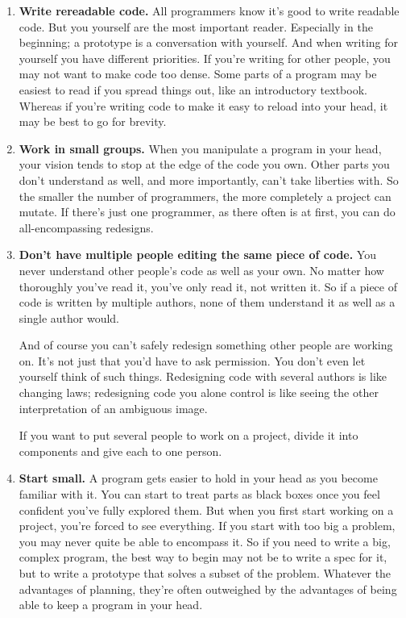 \begin{enumerate}
\item  \textbf{Write rereadable code.}  All programmers know it's good to write
   readable code.  But you yourself are the most important reader.
   Especially in the beginning; a prototype is a conversation with
   yourself.  And when writing for yourself you have different
   priorities.  If you're writing for other people, you may not
   want to make code too dense.  Some parts of a program may be
   easiest to read if you spread things out, like an introductory 
   textbook.  Whereas if you're writing code to make it easy to reload 
   into your head, it may be best to go for brevity.


\item  \textbf{Work in small groups.}  When you manipulate a program in your
   head, your vision tends to stop at the edge of the code you own.
   Other parts you don't understand as well, and more importantly,
   can't take liberties with.  So the smaller the number of
   programmers, the more completely a project can mutate.  If there's
   just one programmer, as there often is at first, you can do
   all-encompassing redesigns.


\item  \textbf{Don't have multiple people editing the same piece of code.}  You
   never understand other people's code as well as your own.  No
   matter how thoroughly you've read it, you've only read it, not
   written it.  So if a piece of code is written by multiple authors,
   none of them understand it as well as a single author would.

And of course you can't safely redesign something other people
   are working on.  It's not just that you'd have to ask permission.
   You don't even let yourself think of such things.  Redesigning
   code with several authors is like changing laws; redesigning
   code you alone control is like seeing the other interpretation
   of an ambiguous image.

If you want to put several people to work on a project, divide
   it into components and give each to one person.


\item  \textbf{Start small.}  A program gets easier to hold in your head as you
   become familiar with it.  You can start to treat parts as black
   boxes once you feel confident you've fully explored them.  But
   when you first start working on a project, you're forced to see
   everything.  If you start with too big a problem, you may never
   quite be able to encompass it.  So if you need to write a big,
   complex program, the best way to begin may not be to write a
   spec for it, but to write a prototype that solves a subset of
   the problem.  Whatever the advantages of planning, they're often
   outweighed by the advantages of being able to keep a program in
   your head.

\end{enumerate}

